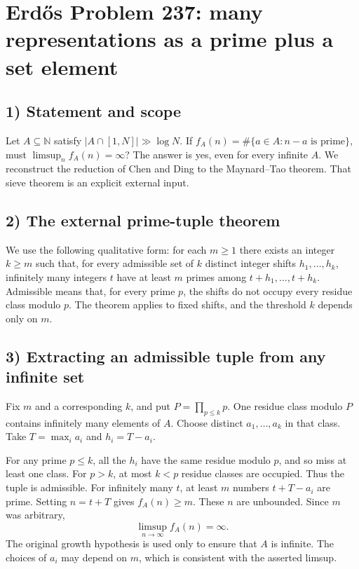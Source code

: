\section{Erd\H{o}s Problem 237: many representations as a prime plus a set element}

\subsection{1) Statement and scope}
Let $A\subseteq\mathbb N$ satisfy $|A\cap[1,N]|\gg\log N$.
If $f_A(n)=\#\{a\in A:n-a\text{ is prime}\}$, must
$\limsup_n f_A(n)=\infty$? The answer is yes, even for every
infinite $A$. We reconstruct the reduction of Chen and Ding
to the Maynard--Tao theorem. That sieve theorem is an explicit
external input.

\subsection{2) The external prime-tuple theorem}
We use the following qualitative form: for each $m\geq1$ there
exists an integer $k\geq m$ such that, for every admissible set
of $k$ distinct integer shifts $h_1,\ldots,h_k$, infinitely many
integers $t$ have at least $m$ primes among $t+h_1,\ldots,t+h_k$.
Admissible means that, for every prime $p$, the shifts do not
occupy every residue class modulo $p$. The theorem applies to
fixed shifts, and the threshold $k$ depends only on $m$.

\subsection{3) Extracting an admissible tuple from any infinite set}
Fix $m$ and a corresponding $k$, and put $P=\prod_{p\leq k}p$.
One residue class modulo $P$ contains infinitely many elements of
$A$. Choose distinct $a_1,\ldots,a_k$ in that class. Take
$T=\max_i a_i$ and $h_i=T-a_i$.

For any prime $p\leq k$, all the $h_i$ have the same residue
modulo $p$, and so miss at least one class. For $p>k$, at most
$k<p$ residue classes are occupied. Thus the tuple is admissible.
For infinitely many $t$, at least $m$ numbers
$t+T-a_i$ are prime. Setting $n=t+T$ gives $f_A(n)\geq m$.
These $n$ are unbounded. Since $m$ was arbitrary,
\[
 \limsup_{n\to\infty}f_A(n)=\infty.
\]
The original growth hypothesis is used only to ensure that $A$
is infinite. The choices of $a_i$ may depend on $m$, which is
consistent with the asserted limsup.

